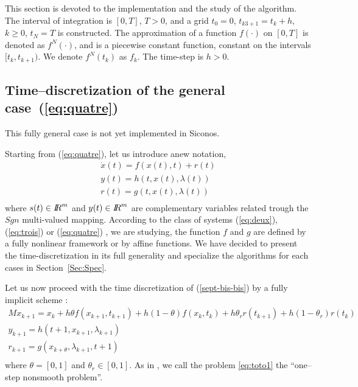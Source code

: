  This section is devoted to the implementation and the study  of the algorithm. The interval of integration is $[0,T]$, $T>0$, and a grid $t_{0}=0$, $t_{k3+1}=t_{k}+h$, $k \geq 0$, $t_{N}=T$ is constructed. The approximation of a function $f(\cdot)$ on $[0,T]$ is denoted as $f^{N}(\cdot)$, and is a piecewise constant function, constant on the intervals $[t_{k},t_{k+1})$. We denote $f^{N}(t_{k})$ as $f_{k}$. The time-step is $h>0$. 




\subsection{Time--discretization of the general case~(\ref{eq:quatre}) } 

This fully general case is not yet implemented in Siconos.

Starting from  (\ref{eq:quatre}), let us introduce anew notation, 
\begin{equation}
\begin{array}{l}
\dot{x}(t) = f(x(t),t) + r(t)  \\[2mm]
y(t) = h(t,x(t),\lambda (t)) \\[2mm]
r(t) = g(t,x(t),\lambda (t) ) \\[2mm]
\end{array}
\label{sept-bis-bis}
\end{equation}
where $s(t) \in \mbox{\rm $I\!\!R$}^m$  and $y(t) \in \mbox{\rm $I\!\!R$}^m$ are  complementary variables related trough the $Sgn$ multi-valued mapping.   According to the class of systems (\ref{eq:deux}), (\ref{eq:trois}) or (\ref{eq:quatre}) , we are studying, the function $f$ and $g$ are defined by a fully nonlinear framework or by affine functions. We have decided to present the time-discretization in its full generality and specialize the algorithms for each cases in Section~\ref{Sec:Spec}.


Let us now proceed with the time discretization of (\ref{sept-bis-bis}) by a fully implicit scheme : 
\begin{equation}
  \begin{array}{l}
    \label{eq:toto1}
     Mx_{k+1} = x_{k} +h\theta f(x_{k+1},t_{k+1})+h(1-\theta) f(x_k,t_k) + h \theta _r r(t_{k+1})
     + h(1-\theta _r)r(t_k)  \\[2mm]
     y_{k+1} =  h(t+1,x_{k+1},\lambda _{k+1}) \\[2mm]
     r_{k+1} = g(x_{k+\theta},\lambda_{k+1},t+1)\\[2mm]
  \end{array}
\end{equation}
where $\theta = [0,1]$ and $\theta _r \in [0,1]$. As in \cite{acary2008}, we call the problem \eqref{eq:toto1} the ``one--step nonsmooth problem''.

